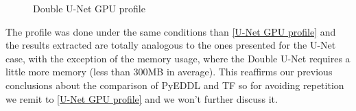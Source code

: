 \begin{figure}[!htb]
    \hfill

    \hfill
    \caption{Double U-Net GPU profile}
\end{figure}

The profile was done under the same conditions than \ref{U-Net GPU profile} and the results extracted are totally analogous to the ones presented for the U-Net case, with the exception of the memory usage, where the Double U-Net requires a little more memory (less than 300MB in average). This reaffirms our previous conclusions about the comparison of PyEDDL and TF so for avoiding repetition we remit to \ref{U-Net GPU profile} and we won't further discuss it.

